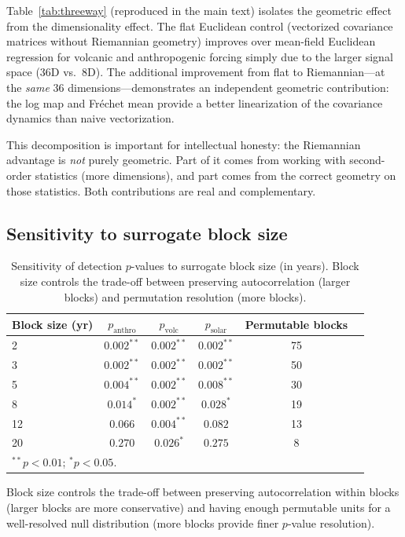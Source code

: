 \documentclass[preprint,12pt]{elsarticle}
\newcommand{\pval}{p}
\begin{document}
Table~\ref{tab:threeway} (reproduced in the main text) isolates the geometric effect from the dimensionality effect.
The flat Euclidean control (vectorized covariance matrices without Riemannian geometry) improves over mean-field Euclidean regression for volcanic and anthropogenic forcing simply due to the larger signal space (36D vs.\ 8D).
The additional improvement from flat to Riemannian---at the \emph{same} 36 dimensions---demonstrates an independent geometric contribution: the log map and Fr\'{e}chet mean provide a better linearization of the covariance dynamics than naive vectorization.

This decomposition is important for intellectual honesty: the Riemannian advantage is \emph{not} purely geometric.
Part of it comes from working with second-order statistics (more dimensions), and part comes from the correct geometry on those statistics.
Both contributions are real and complementary.

\subsection{Sensitivity to surrogate block size}\label{app:blocksize}

\begin{table}[h]
\centering
\caption{Sensitivity of detection $p$-values to surrogate block size (in years). Block size controls the trade-off between preserving autocorrelation (larger blocks) and permutation resolution (more blocks).}
\label{tab:B5}
\begin{tabular}{lccccc}
\toprule
Block size (yr) & $\pval_\mathrm{anthro}$ & $\pval_\mathrm{volc}$ & $\pval_\mathrm{solar}$ & Permutable blocks \\
\midrule
2 & $0.002^{**}$ & $0.002^{**}$ & $0.002^{**}$ & 75 \\
3 & $0.002^{**}$ & $0.002^{**}$ & $0.002^{**}$ & 50 \\
5 & $0.004^{**}$ & $0.002^{**}$ & $0.008^{**}$ & 30 \\
8 & $0.014^{*}$ & $0.002^{**}$ & $0.028^{*}$ & 19 \\
12 & $0.066$ & $0.004^{**}$ & $0.082$ & 13 \\
20 & $0.270$ & $0.026^{*}$ & $0.275$ & 8 \\
\bottomrule
\multicolumn{5}{l}{\footnotesize $^{**}\pval < 0.01$;\; $^{*}\pval < 0.05$.}
\end{tabular}
\end{table}

Block size controls the trade-off between preserving autocorrelation within blocks (larger blocks are more conservative) and having enough permutable units for a well-resolved null distribution (more blocks provide finer $p$-value resolution).
\end{document}
